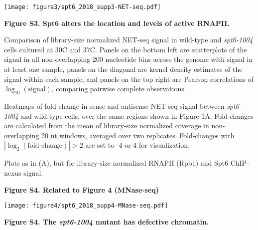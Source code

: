 \documentclass[9pt, letterpaper]{extarticle}
\begin{document}
{\centering \texttt{[image: figure3/spt6\_2018\_supp3-NET-seq.pdf]}\par}

\textbf{Figure S3. Spt6 alters the location and levels of active RNAPII.}

\begin{description}[noitemsep, topsep=0pt, align=right, labelwidth=12pt, itemindent=0pt, leftmargin=0pt]
	\item [\textbf{(A)}] Comparison of library-size normalized NET-seq signal in wild-type and \textit{spt6-1004} cells cultured at 30{\textdegree}C and 37{\textdegree}C. Panels on the bottom left are scatterplots of the signal in all non-overlapping 200 nucleotide bins across the genome with signal in at least one sample, panels on the diagonal are kernel density estimates of the signal within each sample, and panels on the top right are Pearson correlations of $\log_{10}\left(\text{signal} \right)$, comparing pairwise complete observations.
    \item [\textbf{(B)}] Heatmaps of fold-change in sense and antisense NET-seq signal between \textit{spt6-1004} and wild-type cells, over the same regions shown in Figure 1A. Fold-changes are calculated from the mean of library-size normalized coverage in non-overlapping 20 nt windows, averaged over two replicates. Fold-changes with $\left\lvert\log_2\left(\text{fold-change}\right)\right\rvert>2$ are set to -4 or 4 for visualization.
	\item [\textbf{(C)}] Plots as in (A), but for library-size normalized RNAPII (Rpb1) and Spt6 ChIP-nexus signal.
\end{description}

\newpage

\textbf{\large Figure S4. Related to Figure 4 (MNase-seq)}

{\centering \texttt{[image: figure4/spt6\_2018\_supp4-MNase-seq.pdf]}\par}

\textbf{Figure S4. The \textit{spt6-1004} mutant has defective chromatin.}
\end{document}
